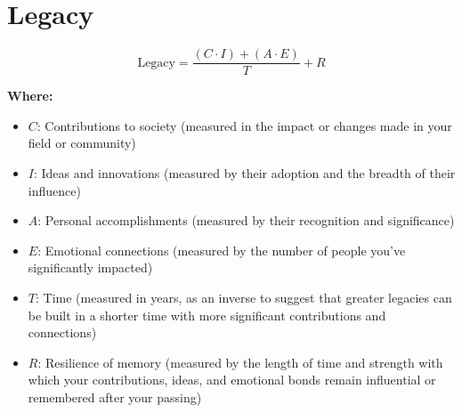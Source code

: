 \chapter{Legacy}

\begin{equation}
\text{Legacy} = \frac{(C \cdot I) + (A \cdot E)}{T} + R
\end{equation}

\textbf{Where:}

\begin{itemize}
    \item $C$: Contributions to society (measured in the impact or changes made in your field or community)
    \item $I$: Ideas and innovations (measured by their adoption and the breadth of their influence)
    \item $A$: Personal accomplishments (measured by their recognition and significance)
    \item $E$: Emotional connections (measured by the number of people you've significantly impacted)
    \item $T$: Time (measured in years, as an inverse to suggest that greater legacies can be built in a shorter time with more significant contributions and connections)
    \item $R$: Resilience of memory (measured by the length of time and strength with which your contributions, ideas, and emotional bonds remain influential or remembered after your passing)
\end{itemize}